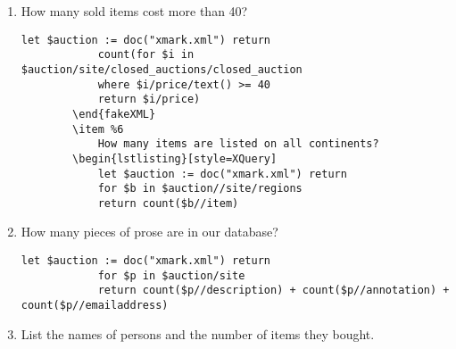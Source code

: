 \begin{enumerate}[label=Q\arabic*.]
		\item %
			How many sold items cost more than 40?		
		\begin{lstlisting}[style=XQuery]
			let $auction := doc("xmark.xml") return
			count(for $i in $auction/site/closed_auctions/closed_auction
			where $i/price/text() >= 40
			return $i/price)
		\end{fakeXML}	
		\item %6
			How many items are listed on all continents?
		\begin{lstlisting}[style=XQuery]
			let $auction := doc("xmark.xml") return
			for $b in $auction//site/regions
			return count($b//item)
		\end{lstlisting}	
		\item %
			How many pieces of prose are in our database?
		\begin{lstlisting}[style=XQuery]
			let $auction := doc("xmark.xml") return
			for $p in $auction/site
			return count($p//description) + count($p//annotation) + count($p//emailaddress)
		\end{lstlisting}	
		\item %
			List the names of persons and the number of items they bought.
			

\end{enumerate}
